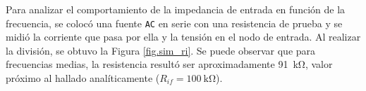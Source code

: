 

Para analizar el comportamiento de la impedancia de entrada en función de la frecuencia, se colocó una fuente \texttt{AC} en serie con una resistencia de prueba y se midió la corriente que pasa por ella y la tensión en el nodo de entrada. Al realizar la división, se obtuvo la Figura \ref{fig.sim_ri}. Se puede observar que para frecuencias medias, la resistencia resultó ser aproximadamente \SI{91}{\kilo\ohm}, valor próximo al hallado analíticamente ($R_{if}=\SI{100}{\kilo\ohm}$).
